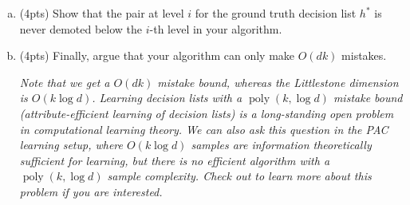 \documentclass[11pt]{article}
\DeclareMathOperator{\poly}{poly}
\newcommand{\blue}[1]{{\color{blue}#1}}
\begin{document}
\begin{enumerate}[(a)]
    
   \item (\blue{4pts}) Show that the pair at level $i$ for the ground truth decision list $h^*$ is never demoted below the $i$-th level in your algorithm.
   
   \item (\blue{4pts}) Finally, argue that your algorithm can only make $O(dk)$ mistakes.
    
    \emph{Note that we get a $O(dk)$ mistake bound, whereas the Littlestone dimension is $O(k\log d)$. Learning decision lists with a $\poly(k, \log d)$ mistake bound (attribute-efficient learning of decision lists) is a long-standing open problem in computational learning theory. We can also ask this question in the PAC learning setup, where $O(k \log d)$ samples are information theoretically sufficient for learning, but there is no efficient algorithm with a $\poly(k, \log d)$ sample complexity. Check out \cite{klivans2006toward,long2006attribute} to learn more about this problem if you are interested.}
    
\end{enumerate}






\end{document}
